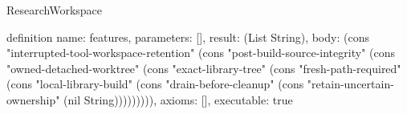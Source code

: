 \begin{lexlean}{ResearchWorkspace}
\begin{semanticmodule}
definition{
 name: features,
 parameters: [],
 result: (List String),
 body: (cons "interrupted-tool-workspace-retention" (cons "post-build-source-integrity" (cons "owned-detached-worktree" (cons "exact-library-tree" (cons "fresh-path-required" (cons "local-library-build" (cons "drain-before-cleanup" (cons "retain-uncertain-ownership" (nil String))))))))),
 axioms: [],
 executable: true
}

\end{semanticmodule}
\end{lexlean}

